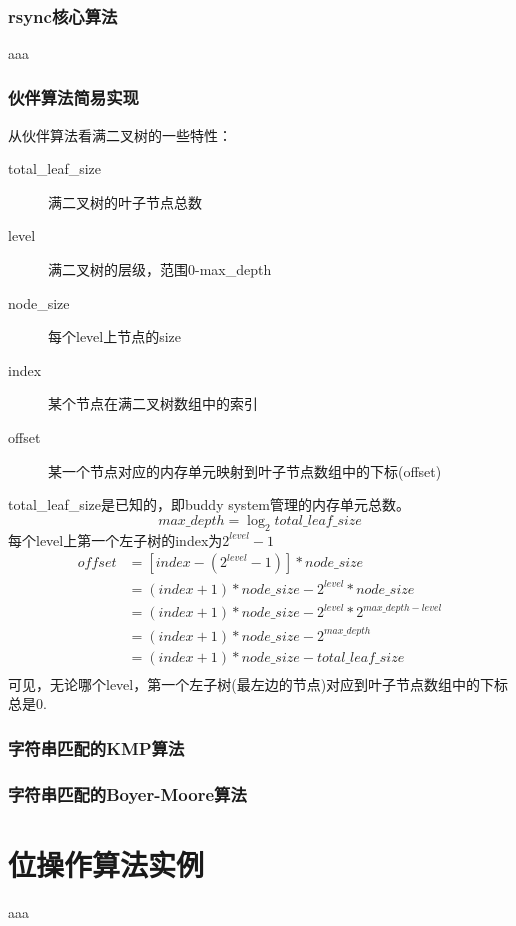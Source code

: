 ﻿\documentclass[a4paper,11pt]{article}
\begin{document}
  \tt %
  \pagestyle{header}
  \sybmaketitle
  \tableofcontents
  \newpage

  \pagestyle{main}
  \setcounter{page}{1}

  \section[rsync核心算法]{rsync核心算法}
  aaa

  \section[伙伴算法简易实现]{伙伴算法简易实现}
  \begin{center}
    
  \end{center}
  
  
  从伙伴算法看满二叉树的一些特性：
  \begin{description}
    \item[total\_leaf\_size] 满二叉树的叶子节点总数
    \item[level] 满二叉树的层级，范围0-max\_depth
    \item[node\_size] 每个level上节点的size
    \item[index] 某个节点在满二叉树数组中的索引
    \item[offset] 某一个节点对应的内存单元映射到叶子节点数组中的下标(offset)
  \end{description}
  total\_leaf\_size是已知的，即buddy system管理的内存单元总数。
  $$ max\_depth = \log_2total\_leaf\_size$$
  每个level上第一个左子树的index为$2^{level} - 1$
  \begin{align*}
    offset & = [index - (2^{level} - 1)] * node\_size \\
           & = (index + 1) * node\_size - 2^{level} * node\_size \\
           & = (index + 1) * node\_size - 2^{level} * 2^{max\_depth - level} \\
           & = (index + 1) * node\_size - 2^{max\_depth} \\
           & = (index + 1) * node\_size - total\_leaf\_size \\
  \end{align*}
  可见，无论哪个level，第一个左子树(最左边的节点)对应到叶子节点数组中的下标总是0.

  \section[字符串匹配的KMP算法]{字符串匹配的KMP算法}

  \section[字符串匹配的Boyer-Moore算法]{字符串匹配的Boyer-Moore算法}

  \part[位操作算法实例]{位操作算法实例}
  aaa
\end{document}
